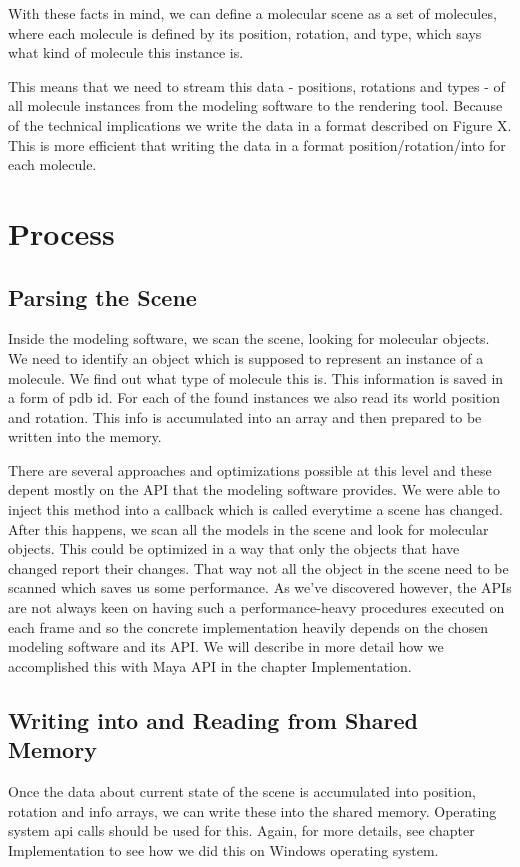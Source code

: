 \documentclass[
  digital, %
  table,   %
  nolof,     %
  nolot,     %
]{fithesis3}
\begin{document}
With these facts in mind, we can define a molecular scene as a set of molecules, where each molecule is defined by its position, rotation, and type, which says what kind of molecule this instance is.

This means that we need to stream this data - positions, rotations and types - of all molecule instances from the modeling software to the rendering tool. Because of the technical implications we write the data in a format described on Figure X. This is more efficient that writing the data in a format position/rotation/into for each molecule.
\section{Process}
\subsection{Parsing the Scene}
Inside the modeling software, we scan the scene, looking for molecular objects. We need to identify an object which is supposed to represent an instance of a molecule. We find out what type of molecule this is. This information is saved in a form of pdb id. For each of the found instances we also read its world position and rotation. This info is accumulated into an array and then prepared to be written into the memory.

There are several approaches and optimizations possible at this level and these depent mostly on the API that the modeling software provides. We were able to inject this method into a callback which is called everytime a scene has changed. After this happens, we scan all the models in the scene and look for molecular objects. This could be optimized in a way that only the objects that have changed report their changes. That way not all the object in the scene need to be scanned which saves us some performance. As we've discovered however, the APIs are not always keen on having such a performance-heavy procedures executed on each frame and so the concrete implementation heavily depends on the chosen modeling software and its API. We will describe in more detail how we accomplished this with Maya API in the chapter Implementation.

\subsection{Writing into and Reading from Shared Memory}
Once the data about current state of the scene is accumulated into position, rotation and info arrays, we can write these into the shared memory. Operating system api calls should be used for this. Again, for more details, see chapter Implementation to see how we did this on Windows operating system.
\end{document}
